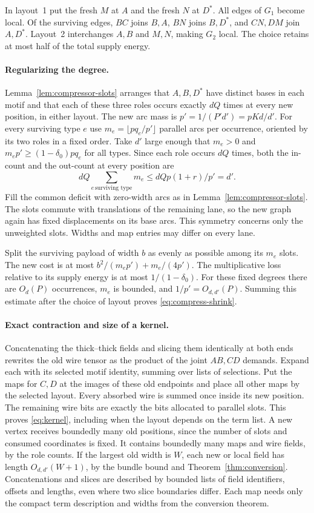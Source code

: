 In layout~1 put the fresh $M$ at $A$ and the fresh $N$ at $D^*$. All edges
of $G_1$ become local. Of the surviving edges, $BC$ joins $B,A$, $BN$ joins
$B,D^*$, and $CN,DM$ join $A,D^*$. Layout~2 interchanges $A,B$ and $M,N$,
making $G_2$ local. The choice retains at most half of the total supply energy.

\paragraph{Regularizing the degree.}
Lemma~\ref{lem:compressor-slots} arranges that $A,B,D^*$ have distinct
bases in each motif and that each of these three roles occurs exactly $dQ$
times at every new position, in either layout.
The new arc mass is $p'=1/(P'd')=pKd/d'$. For every surviving type $e$ use
$m_e=\lfloor p q_e/p'\rfloor$ parallel arcs per occurrence, oriented by its
two roles in a fixed order. Take $d'$ large enough that $m_e>0$ and
$m_e p'\ge(1-\delta_0)p q_e$ for all types. Since each role occurs $dQ$
times, both the in-count and the out-count at every position are
\[
       dQ\sum_{e\,\text{surviving type}}m_e
       \le dQp(1+r)/p'=d'.
\]
Fill the common deficit with zero-width arcs as in
Lemma~\ref{lem:compressor-slots}. The slots commute with translations of the
remaining lane, so the new graph again has fixed displacements on its base
arcs. This symmetry concerns only the unweighted slots. Widths and map
entries may differ on every lane.

Split the surviving payload of width $b$ as evenly as possible among its
$m_e$ slots. The new cost is at most $b^2/(m_ep')+m_e/(4p')$.
The multiplicative loss relative to its supply energy is at most
$1/(1-\delta_0)$. For these fixed degrees there are $O_d(P)$ occurrences,
$m_e$ is bounded, and $1/p'=O_{d,d'}(P)$. Summing this estimate after the
choice of layout proves \eqref{eq:compress-shrink}.

\paragraph{Exact contraction and size of a kernel.}
Concatenating the thick--thick fields and slicing them identically at both
ends rewrites the old wire tensor as the product of the joint $AB,CD$
demands. Expand each with its selected motif identity, summing over lists
of selections. Put the maps for $C,D$ at the images of these old endpoints
and place all other maps by the selected layout. Every absorbed wire is
summed once inside its new position. The remaining wire bits are exactly the
bits allocated to parallel slots. This proves \eqref{eq:kernel}, including
when the layout depends on the term list. A new vertex receives boundedly many
old positions, since the number of slots and consumed coordinates is fixed.
It contains boundedly many maps and wire fields, by the role counts. If the
largest old width is $W$, each new or local field has length $O_{d,d'}(W+1)$,
by the bundle bound and Theorem~\ref{thm:conversion}. Concatenations and
slices are described by bounded lists of field identifiers, offsets and
lengths, even where two slice boundaries differ. Each map needs only the
compact term description and widths from the conversion theorem.
